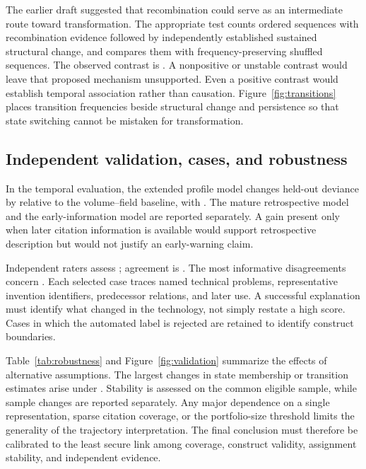 The earlier draft suggested that recombination could serve as an intermediate
route toward transformation. The appropriate test counts ordered sequences with
recombination evidence followed by independently established sustained structural
change, and compares them with frequency-preserving shuffled sequences. The
observed contrast is . A nonpositive or unstable
contrast would leave that proposed mechanism unsupported. Even a positive contrast
would establish temporal association rather than causation. Figure~\ref{fig:transitions}
places transition frequencies beside structural change and persistence so that
state switching cannot be mistaken for transformation.





\subsection{Independent validation, cases, and robustness}
In the temporal evaluation, the extended profile model changes held-out deviance
by  relative to the volume--field baseline, with
. The mature retrospective model
and the early-information model are reported separately. A gain present only when
later citation information is available would support retrospective description
but would not justify an early-warning claim.

Independent raters assess ; agreement is
. The most informative disagreements
concern . Each selected case traces
named technical problems, representative invention identifiers, predecessor
relations, and later use. A successful explanation must identify what changed
in the technology, not simply restate a high score. Cases in which the automated
label is rejected are retained to identify construct boundaries.

Table~\ref{tab:robustness} and Figure~\ref{fig:validation} summarize the effects of
alternative assumptions. The largest changes in state membership or transition
estimates arise under . Stability is assessed on
the common eligible sample, while sample changes are reported separately. Any
major dependence on a single representation, sparse citation coverage, or the
portfolio-size threshold limits the generality of the trajectory interpretation.
The final conclusion must therefore be calibrated to the least secure link among
coverage, construct validity, assignment stability, and independent evidence.

